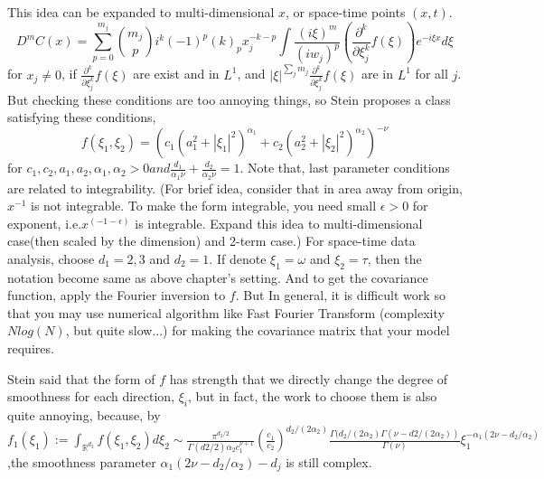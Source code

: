 \documentclass{article}
\begin{document}
{This idea can be expanded to multi-dimensional $x$, or space-time points $(x,t)$.
\[D^mC(x)=\sum_{p=0}^{m_j}\binom{m_j}{p}i^k (-1)^p (k)_p x_j^{-k-p}\int \frac{(i\xi)^m}{(iw_j)^p}(\frac{\partial^k}{\partial \xi_j^k}f(\xi))e^{-i\xi x}d\xi\]
for $x_j \neq 0$, if $\frac{\partial^k}{\partial \xi_j^k}f(\xi)$ are exist and in $L^1$, and $|\xi|^{\sum_j m_j}\frac{\partial^k}{\partial \xi_j^k}f(\xi)$ are in $L^1$ for all $j$.
But checking these conditions are too annoying things, so Stein proposes a class satisfying these conditions,
\[f(\xi_1,\xi_2)=(c_1(a_1^2+|\xi_1|^2)^{\alpha_1} + c_2(a_2^2+|\xi_2|^2)^{\alpha_2})^{-\nu}\]
for $c_1,c_2,a_1,a_2,\alpha_1,\alpha_2>0 and \frac{d_1}{\alpha_1\nu}+\frac{d_2}{\alpha_2\nu}=1$.
Note that, last parameter conditions are related to integrability. (For brief idea, consider that in area away from origin,
$x^{-1}$ is not integrable. To make the form integrable, you need small $\epsilon>0$ for exponent, i.e.$x^(-1-\epsilon)$ is integrable.
Expand this idea to multi-dimensional case(then scaled by the dimension) and 2-term case.)
For space-time data analysis, choose $d_1=2,3$ and $d_2=1$. If denote $\xi_1=\omega$ and $\xi_2=\tau$, then the notation become same as above chapter's setting.
And to get the covariance function, apply the Fourier inversion to $f$.
But In general, it is difficult work so that you may use numerical algorithm like Fast Fourier Transform (complexity $Nlog(N)$, but quite slow...) for making the covariance matrix that your model requires.

Stein said that the form of $f$ has strength that we directly change the degree of smoothness for each direction, $\xi_i$,
but in fact, the work to choose them is also quite annoying, because, by
\(f_1(\xi_1):=\int_{\mathbb R^{d_2}} f(\xi_1,\xi_2)d\xi_2 \sim 
\frac{\pi^{d_2/2}}{\Gamma(d2/2)\alpha_2c_1^{\nu+1}} (\frac{c_1}{c_2})^{d_2/(2\alpha_2)} \frac{\Gamma(d_2/(2\alpha_2)\Gamma(\nu-d2/(2\alpha_2))}{\Gamma(\nu)}\xi_1^{-\alpha_1(2\nu-d_2/\alpha_2)} \)
,the smoothness parameter $\alpha_1(2\nu-d_2/\alpha_2)-d_j$ is still complex.

}
\end{document}
